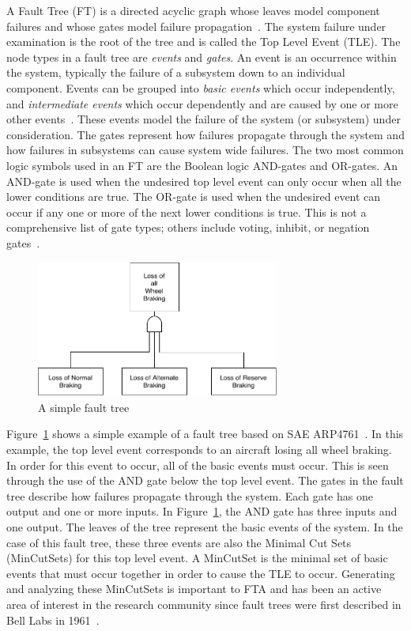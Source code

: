 A Fault Tree (FT) is a directed acyclic graph whose leaves model component failures and whose gates model failure propagation~\cite{0f356f05e72f43018211b36f97c8854a}. The system failure under examination is the root of the tree and is called the Top Level Event (TLE). The node types in a fault tree are \textit{events} and \textit{gates}. An event is an occurrence within the system, typically the failure of a subsystem down to an individual component. Events can be grouped into \textit{basic events} which occur independently, and \textit{intermediate events} which occur dependently and are caused by one or more other events~\cite{historyFTA}.  These events model the failure of the system (or subsystem) under consideration. The gates represent how failures propagate through the system and how failures in subsystems can cause system wide failures. The two most common logic symbols used in an FT are the Boolean logic AND-gates and OR-gates. An AND-gate is used when the undesired top level event can only occur when all the lower conditions are true. The OR-gate is used when the undesired event can occur if any one or more of the next lower conditions is true. This is not a comprehensive list of gate types; others include voting, inhibit, or negation gates~\cite{0f356f05e72f43018211b36f97c8854a}.
\begin{figure}[h]
\begin{center}
\includegraphics[width=8cm]{images/introFT2.pdf}
\caption{A simple fault tree} \label{fig:introFT}
\end{center}
\end{figure}

Figure~\ref{fig:introFT} shows a simple example of a fault tree based on SAE ARP4761~\cite{SAE:ARP4761}. In this example, the top level event corresponds to an aircraft losing all wheel braking. In order for this event to occur, all of the basic events must occur. This is seen through the use of the AND gate below the top level event. The gates in the fault tree describe how failures propagate through the system. Each gate has one output and one or more inputs. In Figure~\ref{fig:introFT}, the AND gate has three inputs and one output. The leaves of the tree represent the basic events of the system. %
In the case of this fault tree, these three events are also the Minimal Cut Sets (MinCutSets) for this top level event. A MinCutSet is the minimal set of basic events that must occur together in order to cause the TLE to occur. Generating and analyzing these MinCutSets is important to FTA and has been an active area of interest in the research community since fault trees were first described in Bell Labs in 1961~\cite{historyFTA,0f356f05e72f43018211b36f97c8854a}. 

